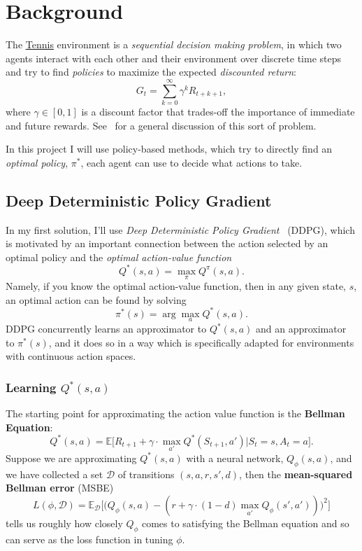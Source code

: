 \documentclass[sigchi]{acmart}
\begin{document}
\section{Background}

The 
\href{https://github.com/Unity-Technologies/ml-agents/blob/master/docs/Learning-Environment-Examples.md#tennis}{\underline{Tennis}}
environment is a {\em sequential decision making problem}, in which two agents interact with each other and their environment over discrete time
steps and try to find {\em policies} to maximize the expected {\em discounted return}:
$$G_t = \sum_{k=0}^{\infty}\gamma^kR_{t+k+1},$$
where $\gamma\in[0,1]$  is a discount factor that trades-off the importance of immediate and future rewards.
See~\cite{DBLP:books/lib/SuttonB98} for a general discussion of this sort of problem. 

In this project I will use policy-based methods, which try to directly  find an {\em optimal policy}, $\pi^*$, each agent can use to decide what actions to take. 

\subsection{Deep Deterministic Policy Gradient}

In my first solution, I'll use 
 {\em Deep Deterministic Policy Gradient}~\cite{Silver:2014:DPG:3044805.3044850} (DDPG),
which is motivated by an important connection between the action selected by an optimal policy and the {\em optimal action-value function} 
	$$Q^*(s, a) =  \max_{\pi}Q^{\pi}(s,a).$$
Namely, if you know the optimal action-value function, then in any given state, $s$, an optimal action can be found by solving
	 $$\pi^*(s) = \arg\max_a Q^*(s,a).$$
 DDPG concurrently learns an approximator to $Q^*(s,a)$ and an approximator to $\pi^*(s)$, and it does so in a way which is specifically adapted for environments with continuous action spaces. 

\subsubsection{Learning $Q^*(s,a)$}

The starting point for approximating the action value function is the \textbf{Bellman Equation}:
$$Q^{*}(s,a) = \mathbb{E}\big[R_{t+1}+\gamma\cdot \max_{a'}Q^{*}(S_{t+1},a')| S_t = s, A_t=a\big].$$
Suppose we are approximating $Q^*(s, a)$ with a neural network, $Q_\phi(s,a)$, and we have collected a set $\mathcal{D}$ of
transitions $(s, a, r, s', d)$, then the \textbf{mean-squared Bellman error} (MSBE)
		$$L(\phi, \mathcal{D}) = \mathbb{E}_{\mathcal{D}}\big[\big(Q_\phi(s,a)-(r+\gamma\cdot(1-d)\max_{a'}Q_\phi(s',a'))\big)^2\big]$$
tells us roughly how closely $Q_{\phi}$ comes to satisfying the Bellman equation and so can serve as the loss function in tuning $\phi$.
\end{document}
